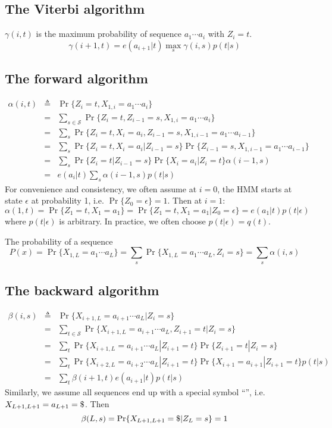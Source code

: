 \documentclass[10pt]{article}
\begin{document}
\subsection{The Viterbi algorithm}
$\gamma(i,t)$ is the maximum probability of sequence $a_1\cdots a_i$ with $Z_i=t$.
$$
\gamma(i+1,t)=e(a_{i+1}|t)\max_s\gamma(i,s)p(t|s)
$$

\subsection{The forward algorithm}
\begin{eqnarray*}
\alpha(i,t)&\triangleq&\Pr\{Z_i=t,X_{1,i}=a_1\cdots a_i\}\\
&=&\sum_{s\in\mathcal{S}}\Pr\{Z_i=t,Z_{i-1}=s,X_{1,i}=a_1\cdots a_i\}\\
&=&\sum_s\Pr\{Z_i=t,X_i=a_i,Z_{i-1}=s,X_{1,{i-1}}=a_1\cdots a_{i-1}\}\\
&=&\sum_s\Pr\{Z_i=t,X_i=a_i|Z_{i-1}=s\}\Pr\{Z_{i-1}=s,X_{1,{i-1}}=a_1\cdots a_{i-1}\}\\
&=&\sum_s\Pr\{Z_i=t|Z_{i-1}=s\}\Pr\{X_i=a_i|Z_i=t\}\alpha(i-1,s)\\
&=&e(a_i|t)\sum_s\alpha(i-1,s)p(t|s)
\end{eqnarray*}
For convenience and consistency, we often assume at $i=0$, the HMM starts at
state $\epsilon$ at probability 1, i.e. $\Pr\{Z_0=\epsilon\}=1$. Then at $i=1$:
$$
\alpha(1,t)=\Pr\{Z_1=t,X_1=a_1\}=\Pr\{Z_1=t,X_1=a_1|Z_0=\epsilon\}=e(a_1|t)p(t|\epsilon)
$$
where $p(t|\epsilon)$ is arbitrary. In practice, we often choose
$p(t|\epsilon)=q(t)$.

The probability of a sequence
$$
P(x)=\Pr\{X_{1,L}=a_1\cdots a_L\}=\sum_s\Pr\{X_{1,L}=a_1\cdots a_L,Z_i=s\}=\sum_s\alpha(i,s)
$$

\subsection{The backward algorithm}
\begin{eqnarray*}
\beta(i,s)&\triangleq&\Pr\{X_{i+1,L}=a_{i+1}\cdots a_L|Z_i=s\}\\
&=&\sum_{t\in\mathcal{S}}\Pr\{X_{i+1,L}=a_{i+1}\cdots a_L,Z_{i+1}=t|Z_i=s\}\\
&=&\sum_t\Pr\{X_{i+1,L}=a_{i+1}\cdots a_L|Z_{i+1}=t\}\Pr\{Z_{i+1}=t|Z_i=s\}\\
&=&\sum_t\Pr\{X_{i+2,L}=a_{i+2}\cdots a_L|Z_{i+1}=t\}\Pr\{X_{i+1}=a_{i+1}|Z_{i+1}=t\}p(t|s)\\
&=&\sum_t\beta(i+1,t)e(a_{i+1}|t)p(t|s)
\end{eqnarray*}
Similarly, we assume all sequences end up with a special symbol
``{\tt{}}'', i.e. $X_{L+1,L+1}=a_{L+1}={\tt\char36}$. Then
$$
\beta(L,s)=\Pr\{X_{L+1,L+1}={\tt\char36}|Z_L=s\}=1
$$
\end{document}

